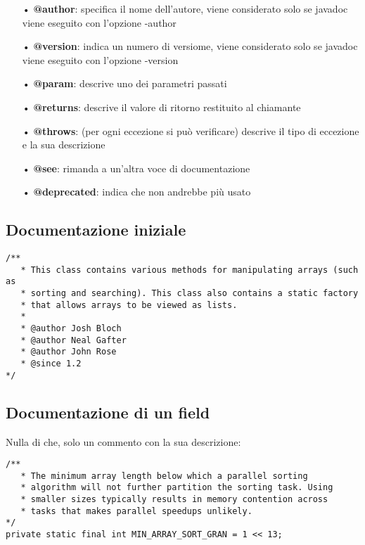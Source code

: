 \documentclass{article}
\begin{document}
\begin{itemize}
   \item[•] \textbf{@author}: specifica il nome dell'autore, viene considerato solo se javadoc viene eseguito con l'opzione -author 
   \item[•] \textbf{@version}: indica un numero di versiome, viene considerato solo se javadoc viene eseguito con l'opzione -version 
   \item[•] \textbf{@param}: descrive uno dei parametri passati
   \item[•] \textbf{@returns}: descrive il valore di ritorno restituito al chiamante 
   \item[•] \textbf{@throws}: (per ogni eccezione si può verificare) descrive il tipo di eccezione e la sua descrizione 
   \item[•] \textbf{@see}: rimanda a un'altra voce di documentazione 
   \item[•] \textbf{@deprecated}: indica che non andrebbe più usato
\end{itemize}

\subsection{Documentazione iniziale}
\begin{verbatim}
/**
   * This class contains various methods for manipulating arrays (such as
   * sorting and searching). This class also contains a static factory
   * that allows arrays to be viewed as lists.
   *
   * @author Josh Bloch
   * @author Neal Gafter
   * @author John Rose
   * @since 1.2
*/
\end{verbatim}

\subsection{Documentazione di un field}
Nulla di che, solo un commento con la sua descrizione:
\\
\begin{verbatim}
/**
   * The minimum array length below which a parallel sorting
   * algorithm will not further partition the sorting task. Using
   * smaller sizes typically results in memory contention across
   * tasks that makes parallel speedups unlikely.
*/
private static final int MIN_ARRAY_SORT_GRAN = 1 << 13;
\end{verbatim}

\newpage
\end{document}
